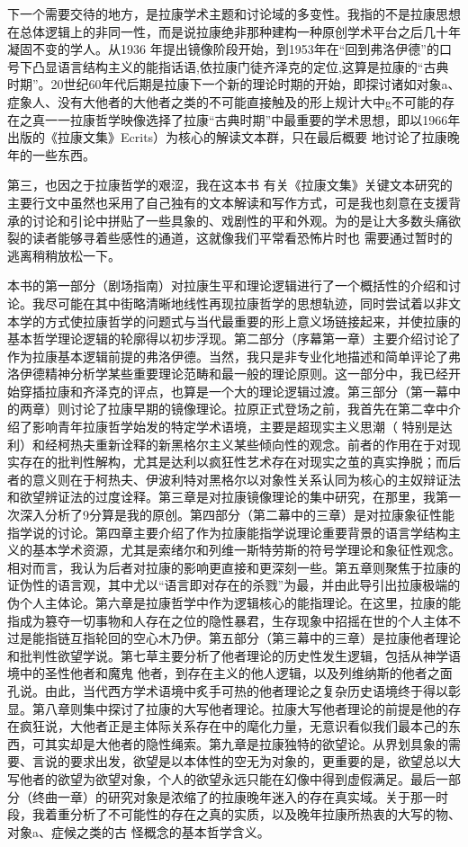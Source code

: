 \documentclass{article}
\begin{document}
下一个需要交待的地方，是拉康学术主题和讨论域的多变性。我指的不是拉康思想在总体逻辑上的非同一性，而是说拉康绝非那种建构一种原创学术平台之后几十年凝固不变的学人。从1936 年提出镜像阶段开始，到1953年在“回到弗洛伊德”的口号下凸显语言结构主义的能指话语,依拉康门徒齐泽克的定位,这算是拉康的“古典时期”。20世纪60年代后期是拉康下一个新的理论时期的开始，即探讨诸如对象a、症象人、没有大他者的大他者之类的不可能直接触及的形上规计大中g不可能的存在之真一一拉康哲学映像选择了拉康“古典时期”中最重要的学术思想，即以1966年出版的《拉康文集》Ecrits）为核心的解读文本群，只在最后概要
地讨论了拉康晚年的一些东西。 

第三，也因之于拉康哲学的艰涩，我在这本书
\newpage
有关《拉康文集》关键文本研究的主要行文中虽然也采用了自己独有的文本解读和写作方式，可是我也刻意在支援背承的讨论和引论中拼贴了一些具象的、戏剧性的平和外观。为的是让大多数头痛欲裂的读者能够寻着些感性的通道，这就像我们平常看恐怖片时也
需要通过暂时的逃离稍稍放松一下。 

本书的第一部分（剧场指南）对拉康生平和理论逻辑进行了一个概括性的介绍和讨论。我尽可能在其中街略清晰地线性再现拉康哲学的思想轨迹，同时尝试着以非文本学的方式使拉康哲学的问题式与当代最重要的形上意义场链接起来，并使拉康的基本哲学理论逻辑的轮廓得以初步浮现。第二部分（序幕第一章）主要介绍讨论了作为拉康基本逻辑前提的弗洛伊德。当然，我只是非专业化地描述和简单评论了弗洛伊德精神分析学某些重要理论范畴和最一般的理论原则。这一部分中，我已经开始穿插拉康和齐泽克的评点，也算是一个大的理论逻辑过渡。第三部分（第一幕中的两章）则讨论了拉康早期的镜像理论。拉原正式登场之前，我首先在第二幸中介绍了影响青年拉康哲学始发的特定学术语境，主要是超现实主义思潮（
\newpage
特别是达利）和经柯热夫重新诠释的新黑格尔主义某些倾向性的观念。前者的作用在于对现实存在的批判性解构，尤其是达利以疯狂性艺术存在对现实之茧的真实挣脱；而后者的意义则在于柯热夫、伊波利特对黑格尔以对象性关系认同为核心的主奴辩证法和欲望辨证法的过度诠释。第三章是对拉康镜像理论的集中研究，在那里，我第一次深入分析了9分算是我的原创。第四部分（第二幕中的三章）是对拉康象征性能指学说的讨论。第四章主要介绍了作为拉康能指学说理论重要背景的语言学结构主义的基本学术资源，尤其是索绪尔和列维一斯特劳斯的符号学理论和象征性观念。相对而言，我认为后者对拉康的影响更直接和更深刻一些。第五章则聚焦于拉康的证伪性的语言观，其中尤以“语言即对存在的杀戮”为最，并由此导引出拉康极端的伪个人主体论。第六章是拉康哲学中作为逻辑核心的能指理论。在这里，拉康的能指成为篡夺一切事物和人存在之位的隐性暴君，生存现象中招摇在世的个人主体不过是能指链互指轮回的空心木乃伊。第五部分（第三幕中的三章）是拉康他者理论和批判性欲望学说。第七草主要分析了他者理论的历史性发生逻辑，包括从神学语境中的圣性他者和魔鬼
\newpage
他者，到存在主义的他人逻辑，以及列维纳斯的他者之面孔说。由此，当代西方学术语境中炙手可热的他者理论之复杂历史语境终于得以彰显。第八章则集中探讨了拉康的大写他者理论。拉康大写他者理论的前提是他的存在疯狂说，大他者正是主体际关系存在中的麾化力量，无意识看似我们最本己的东西，可其实却是大他者的隐性绳索。第九章是拉康独特的欲望论。从界划具象的需要、言说的要求出发，欲望是以本体性的空无为对象的，更重要的是，欲望总以大写他者的欲望为欲望对象，个人的欲望永远只能在幻像中得到虚假满足。最后一部分（终曲一章）的研究对象是浓缩了的拉康晚年迷入的存在真实域。关于那一时段，我着重分析了不可能性的存在之真的实质，以及晚年拉康所热衷的大写的物、对象a、症候之类的古
怪概念的基本哲学含义。 
\end{document}
